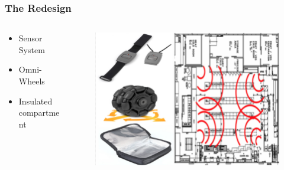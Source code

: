 \documentclass[12pt]{beamer}
\begin{document}

\begin{frame}
\frametitle{The Redesign }
    \begin{columns}
        \begin{column}{3cm}
            \begin{itemize}
	
      \item Sensor System
      \item Omni-Wheels 
      \item Insulated compartment
    \end{itemize}
          
        \end{column}
        \begin{column}{8cm}
        \vspace{-1cm}
            \begin{figure}
                \includegraphics[scale=0.4]{images/Finaldesign.png}
                
            \end{figure}
        \end{column}
    \end{columns}
\end{frame}



\end{document}
